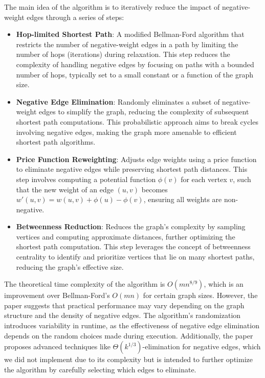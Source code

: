 \documentclass[12pt]{article}
\begin{document}
The main idea of the algorithm is to iteratively reduce the impact of negative-weight edges through a series of steps:
\begin{itemize}
    \item \textbf{Hop-limited Shortest Path}: A modified Bellman-Ford algorithm that restricts the number of negative-weight edges in a path by limiting the number of hops (iterations) during relaxation. This step reduces the complexity of handling negative edges by focusing on paths with a bounded number of hops, typically set to a small constant or a function of the graph size.
    \item \textbf{Negative Edge Elimination}: Randomly eliminates a subset of negative-weight edges to simplify the graph, reducing the complexity of subsequent shortest path computations. This probabilistic approach aims to break cycles involving negative edges, making the graph more amenable to efficient shortest path algorithms.
    \item \textbf{Price Function Reweighting}: Adjusts edge weights using a price function to eliminate negative edges while preserving shortest path distances. This step involves computing a potential function \(\phi(v)\) for each vertex \(v\), such that the new weight of an edge \((u, v)\) becomes \(w'(u, v) = w(u, v) + \phi(u) - \phi(v)\), ensuring all weights are non-negative.
    \item \textbf{Betweenness Reduction}: Reduces the graph’s complexity by sampling vertices and computing approximate distances, further optimizing the shortest path computation. This step leverages the concept of betweenness centrality to identify and prioritize vertices that lie on many shortest paths, reducing the graph’s effective size.
\end{itemize}

The theoretical time complexity of the algorithm is \(O(m n^{8/9})\), which is an improvement over Bellman-Ford’s \(O(mn)\) for certain graph sizes. However, the paper suggests that practical performance may vary depending on the graph structure and the density of negative edges. The algorithm’s randomization introduces variability in runtime, as the effectiveness of negative edge elimination depends on the random choices made during execution. Additionally, the paper proposes advanced techniques like \(\Theta(k^{1/3})\)-elimination for negative edges, which we did not implement due to its complexity but is intended to further optimize the algorithm by carefully selecting which edges to eliminate.
\end{document}
